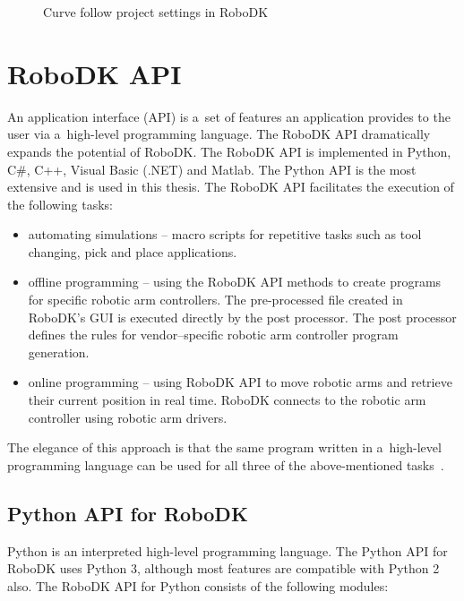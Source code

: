 \begin{figure}[h!]
    \centering
    \noindent{}
    \caption{Curve follow project settings in RoboDK}
    \label{fig:curvefollow}
\end{figure}

\section{RoboDK API}

An application interface (API) is a~set of features an application provides to the user via a~high-level programming language. The RoboDK API dramatically expands the potential of RoboDK. The RoboDK API is implemented in Python, C\#, C++, Visual Basic (.NET) and Matlab.  The Python API is the most extensive and is used in this thesis. The RoboDK API facilitates the execution of the following tasks:

\begin{itemize}
    
 \item automating simulations -- macro scripts for repetitive tasks such as tool changing, pick and place applications.

 \item offline programming -- using the RoboDK API methods to create programs for specific robotic arm controllers. The pre-processed  file created in RoboDK's GUI is executed directly by the post processor. The post processor defines the rules for vendor--specific robotic arm controller program generation. 

 \item online programming -- using RoboDK API to move robotic arms and retrieve their current position in real time. RoboDK connects to the robotic arm controller using robotic arm drivers.

\end{itemize}
The elegance of this approach is that the same program written in a~high-level programming language can be used for all three of the above-mentioned tasks~\cite{robodkapi}. 

\subsection{Python API for RoboDK}

Python is an interpreted high-level programming language. The Python API for RoboDK uses Python 3, although most features are compatible with Python 2 also. The RoboDK API for Python consists of the following modules:

